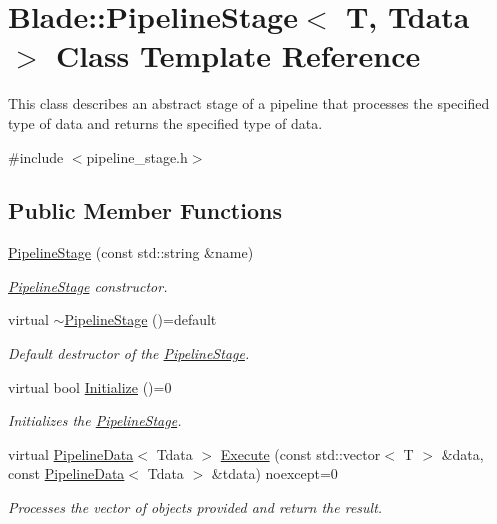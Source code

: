 \hypertarget{class_blade_1_1_pipeline_stage}{}\section{Blade\+:\+:Pipeline\+Stage$<$ T, Tdata $>$ Class Template Reference}
\label{class_blade_1_1_pipeline_stage}


This class describes an abstract stage of a pipeline that processes the specified type of data and returns the specified type of data.  




{\ttfamily \#include $<$pipeline\+\_\+stage.\+h$>$}

\subsection*{Public Member Functions}
\begin{DoxyCompactItemize}
\item 
\hyperlink{class_blade_1_1_pipeline_stage_acc9f2dc27495c661bd4d985f9b7ab764}{Pipeline\+Stage} (const std\+::string \&name)
\begin{DoxyCompactList}\small\item\em \hyperlink{class_blade_1_1_pipeline_stage}{Pipeline\+Stage} constructor. \end{DoxyCompactList}\item 
\mbox{\label{class_blade_1_1_pipeline_stage_a305d6399b99d4bc67ebd6512eedead8a}} 
virtual \hyperlink{class_blade_1_1_pipeline_stage_a305d6399b99d4bc67ebd6512eedead8a}{$\sim$\+Pipeline\+Stage} ()=default
\begin{DoxyCompactList}\small\item\em Default destructor of the \hyperlink{class_blade_1_1_pipeline_stage}{Pipeline\+Stage}. \end{DoxyCompactList}\item 
virtual bool \hyperlink{class_blade_1_1_pipeline_stage_a0b1cca63a255807448e12721c60d91fc}{Initialize} ()=0
\begin{DoxyCompactList}\small\item\em Initializes the \hyperlink{class_blade_1_1_pipeline_stage}{Pipeline\+Stage}. \end{DoxyCompactList}\item 
virtual \hyperlink{class_blade_1_1_pipeline_data}{Pipeline\+Data}$<$ Tdata $>$ \hyperlink{class_blade_1_1_pipeline_stage_a0536c99a8bfd4dc16c6b5d7dca43ed58}{Execute} (const std\+::vector$<$ T $>$ \&data, const \hyperlink{class_blade_1_1_pipeline_data}{Pipeline\+Data}$<$ Tdata $>$ \&tdata) noexcept=0
\begin{DoxyCompactList}\small\item\em Processes the vector of objects provided and return the result. \end{DoxyCompactList}\end{DoxyCompactItemize}


